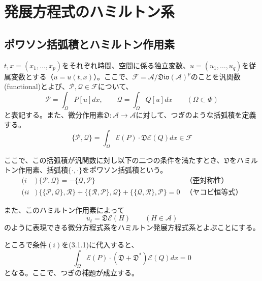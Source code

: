 \documentclass[a4paper, 11pt]{report}
\theoremstyle{definition}
\begin{document}
\newpage

\chapter{発展方程式のハミルトン系}

\section{ポワソン括弧積とハミルトン作用素}

 $t, x=(x_1,\dots, x_p)$をそれぞれ時間、空間に係る独立変数、$u=(u_1,\dots,u_q)$を従属変数とする（$u=u(t, x)$）。ここで、$\mathcal{F}=\mathcal{A} / \mathfrak{Div}(\mathcal{A})^p$のことを汎関数(functional)とよび、$\mathcal{P}, \mathcal{Q}\in \mathcal{F}$について、
\begin{equation*}
\mathcal{P} = \int_\Omega P[u]dx,\qquad \mathcal{Q} = \int_\Omega Q[u]dx \qquad (\Omega \subset \Phi)
\end{equation*}
と表記する。また、微分作用素$\mathfrak{D}:\mathcal{A}\longrightarrow\mathcal{A}$に対して、つぎのような括弧積を定義する。
\begin{equation}
\{ \mathcal{P}, \mathcal{Q} \} = \int_\Omega \mathcal{E}(P)\cdot\mathfrak{D}\mathcal{E}(Q)dx \in \mathcal{F}  %
\end{equation}

 ここで、この括弧積が汎関数に対し以下の二つの条件を満たすとき、$\mathfrak{D}$をハミルトン作用素、括弧積$\{\cdot , \cdot \}$をポワソン括弧積という。
\begin{align*}
(i  &)\, \{ \mathcal{P}, \mathcal{Q} \} = -\{ \mathcal{Q}, \mathcal{P} \} \qquad &\text{（歪対称性）}\\
(ii &)\, \{ \{ \mathcal{P}, \mathcal{Q} \}, \mathcal{R} \} + \{ \{ \mathcal{R}, \mathcal{P} \}, \mathcal{Q} \} + \{ \{ \mathcal{Q}, \mathcal{R} \}, \mathcal{P} \} = 0  &\text{（ヤコビ恒等式）}
\end{align*}

 また、このハミルトン作用素によって
\begin{equation}
u_t = \mathfrak{D}\mathcal{E}(H) \qquad (H\in \mathcal{A})  %
\end{equation}
のように表現できる微分方程式系をハミルトン発展方程式系とよぶことにする。

 ところで条件$(i)$を(3.1.1)に代入すると、
\begin{equation}
\int_\Omega \mathcal{E}(P)\cdot (\mathfrak{D}+\mathfrak{D}^*)\mathcal{E}(Q)dx = 0  %
\end{equation}
となる。ここで、つぎの補題が成立する。
\end{document}
